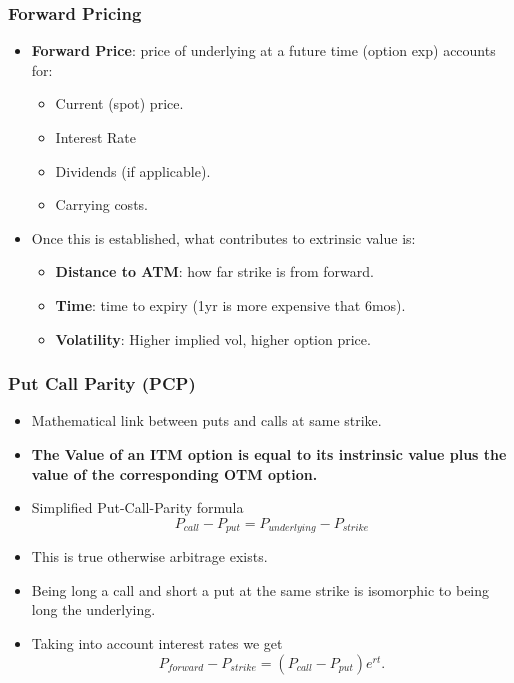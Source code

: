 \documentclass{article}
\begin{document}
\subsubsection{Forward Pricing}
\begin{itemize}
    \item \textbf{Forward Price}: price of underlying at a future time (option exp)
    accounts for:
    \begin{itemize}
        \item Current (spot) price.
        \item Interest Rate 
        \item Dividends (if applicable).
        \item Carrying costs.
    \end{itemize}
    \item Once this is established, what contributes to extrinsic value is:
    \begin{itemize}
        \item \textbf{Distance to ATM}: how far strike is from forward.
        \item \textbf{Time}: time to expiry (1yr is more expensive that 6mos).
        \item \textbf{Volatility}: Higher implied vol, higher option price.
    \end{itemize}
\end{itemize}

\subsubsection{Put Call Parity (PCP)}
\begin{itemize}
    \item Mathematical link between puts and calls at same strike.
    \item \textbf{The Value of an ITM option is equal to its instrinsic value
    plus the value of the corresponding OTM option.}
    \item Simplified Put-Call-Parity formula
    \begin{equation*}
        P_{call} - P_{put} = P_{underlying} - P_{strike}
    \end{equation*}
    \item This is true otherwise arbitrage exists.
    \item Being long a call and short a put at the same strike is isomorphic
    to being long the underlying.
    \item Taking into account interest rates we get
    \begin{equation*}
        P_{forward} - P_{strike} = (P_{call} - P_{put})e^{rt}.
    \end{equation*}
\end{itemize}
\end{document}
